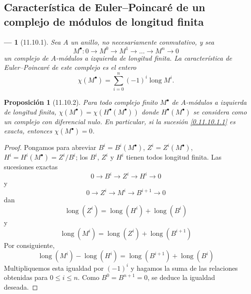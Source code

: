 \documentclass[10pt,oneside,openany]{book}
\theoremstyle{egaenv}\newtheorem*{env}{---}
\theoremstyle{egastatement}
\newtheorem*{proposition}{Proposición}
\theoremstyle{egadescription}
\newcommand{\oldpage}[2][]{\marginnote{\normalfont\scriptsize\textbf{#1}\,|\,#2}\ignorespaces}
\renewcommand{\leq}{\leqslant}
\begin{document}
\subsection{Característica de Euler--Poincar\'e de un complejo de módulos de longitud finita}
\label{subsection:0.11.10}
\label{subsection:0.11.10-fr}

\begin{env}[11.10.1]
\label{0.11.10.1}
\label{0.11.10.1-fr}
Sea $A$ un anillo, no necesariamente conmutativo, y sea
\[
\label{0.11.10.1.1-fr}
\tag{11.10.1.1}
M^\bullet:0\longrightarrow M^0\longrightarrow M^1
\longrightarrow\ldots\longrightarrow M^n\longrightarrow0
\]
un \emph{complejo} de $A$-módulos a izquierda de \emph{longitud finita}.
La \emph{característica de Euler--Poincar\'e} de este complejo es el
entero
\oldpage[0\textsubscript{III}]{49}
\[
\label{0.11.10.1.2-fr}
\tag{11.10.1.2}
\chi(M^\bullet)=\sum_{i=0}^{n}(-1)^i\operatorname{long}M^i.
\]
\end{env}

\begin{proposition}[11.10.2]
\label{0.11.10.2}
\label{0.11.10.2-fr}
Para todo complejo finito $M^\bullet$ de $A$-módulos a izquierda de longitud
finita,
$\chi(M^\bullet)=\chi(H^\bullet(M^\bullet))$
donde $H^\bullet(M^\bullet)$ se considera como un complejo con diferencial
nulo.
En particular, si la sucesión \eqref{0.11.10.1.1} es exacta, entonces
$\chi(M^\bullet)=0$.
\end{proposition}

\begin{proof}
Pongamos para abreviar $B^i=B^i(M^\bullet)$, $Z^i=Z^i(M^\bullet)$, $H^i=H^i(M^\bullet)=Z^i/B^i$; los $B^i$, $Z^i$ y $H^i$ tienen todos
longitud finita.
Las sucesiones exactas
\[
0\longrightarrow B^i\longrightarrow Z^i\longrightarrow H^i
\longrightarrow0
\]
y
\[
0\longrightarrow Z^i\longrightarrow M^i\longrightarrow B^{i+1}
\longrightarrow0
\]
dan
\[
\operatorname{long}(Z^i)=\operatorname{long}(H^i)+
\operatorname{long}(B^i)
\]
y
\[
\operatorname{long}(M^i)=\operatorname{long}(Z^i)+
\operatorname{long}(B^{i+1})
\]
Por consiguiente,
\[
\operatorname{long}(M^i)-\operatorname{long}(H^i)=
\operatorname{long}(B^{i+1})+\operatorname{long}(B^i)
\]
Multipliquemos esta igualdad por $(-1)^i$ y hagamos la suma de las relaciones obtenidas para $0\leq i\leq n$.
Como $B^0=B^{n+1}=0$, se deduce la igualdad deseada.
\end{proof}
\end{document}
